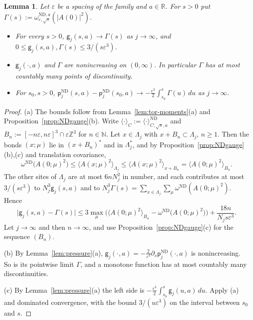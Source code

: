 \documentclass[11pt]{amsart}
\theoremstyle{plain}
\newtheorem{lemma}[theorem]{Lemma}
\theoremstyle{definition}
\theoremstyle{remark}
\numberwithin{equation}{section}
\newcommand{\R}{\mathbb{R}}
\newcommand{\Z}{\mathbb{Z}}
\newcommand{\N}{\mathbb{N}}
\newcommand{\eps}{\varepsilon}
\newcommand{\abs}[1]{\lvert #1\rvert}
\newcommand{\ev}[1]{\langle #1\rangle}
\begin{document}
\begin{lemma}\label{lem:Gamma}
Let $\eps$ be a spacing of the family and $a\in\R$. For $s>0$ put $\Gamma(s):=\omega^{\mathrm{ND},a}_{\eps,\sqrt s}(\abs{A(0)}^2)$.
\begin{itemize}
\item[(a)] For every $s>0$, $\mathsf g_j(s,a)\to\Gamma(s)$ as $j\to\infty$, and $0\le \mathsf g_j(s,a),\Gamma(s)\le3/(s\eps^3)$.
\item[(b)] $\mathsf g_j(\cdot,a)$ and $\Gamma$ are nonincreasing on $(0,\infty)$. In particular $\Gamma$ has at most countably many points of discontinuity.
\item[(c)] For $s_0,s>0$, $\mathsf p^{\mathrm{ND}}_j(s,a)-\mathsf p^{\mathrm{ND}}_j(s_0,a)\to-\frac{\eps^3}2\int_{s_0}^s\Gamma(u)\,du$ as $j\to\infty$.
\end{itemize}
\end{lemma}

\begin{proof}
(a) The bounds follow from Lemma~\ref{lem:tor-moments}(a) and Proposition~\ref{prop:NDgauge}(b). Write $\ev\cdot_C:=\ev\cdot^{\mathrm{ND}}_{C;\sqrt s,a}$ and $B_n:=[-n\eps,n\eps]^3\cap\eps\Z^3$ for $n\in\N$. Let $x\in\Lambda_j$ with $x+B_n\subset\Lambda_j$, $n\ge1$. Then the bonds $(x;\mu)$ lie in $(x+B_n)^*$ and in $\Lambda_j^*$, and by Proposition~\ref{prop:NDgauge}(b),(c) and translation covariance,
\[
\omega^{\mathrm{ND}}\big(A(0;\mu)^2\big)\le\ev{A(x;\mu)^2}_{\Lambda_j}\le\ev{A(x;\mu)^2}_{x+B_n}=\ev{A(0;\mu)^2}_{B_n}.
\]
The other sites of $\Lambda_j$ are at most $6nN_j^2$ in number, and each contributes at most $3/(s\eps^3)$ to $N_j^3\mathsf g_j(s,a)$ and to $N_j^3\Gamma(s)=\sum_{x\in\Lambda_j}\sum_\mu\omega^{\mathrm{ND}}(A(0;\mu)^2)$. Hence
\[
\abs{\mathsf g_j(s,a)-\Gamma(s)}\le3\max_\mu\Big(\ev{A(0;\mu)^2}_{B_n}-\omega^{\mathrm{ND}}\big(A(0;\mu)^2\big)\Big)+\frac{18n}{N_js\eps^3}.
\]
Let $j\to\infty$ and then $n\to\infty$, and use Proposition~\ref{prop:NDgauge}(c) for the sequence $(B_n)$.

(b) By Lemma~\ref{lem:pressure}(a), $\mathsf g_j(\cdot,a)=-\frac2{\eps^3}\partial_s\mathsf p^{\mathrm{ND}}_j(\cdot,a)$ is nonincreasing. So is its pointwise limit $\Gamma$, and a monotone function has at most countably many discontinuities.

(c) By Lemma~\ref{lem:pressure}(a) the left side is $-\frac{\eps^3}2\int_{s_0}^s\mathsf g_j(u,a)\,du$. Apply (a) and dominated convergence, with the bound $3/(u\eps^3)$ on the interval between $s_0$ and $s$.
\end{proof}
\end{document}
